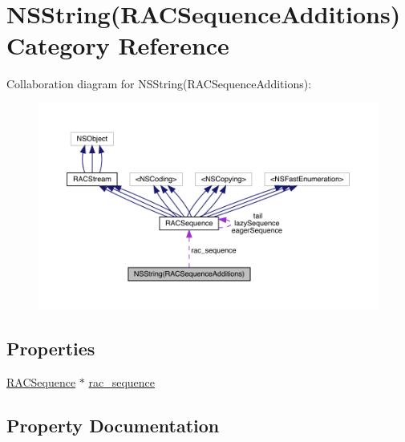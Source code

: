 \hypertarget{category_n_s_string_07_r_a_c_sequence_additions_08}{}\section{N\+S\+String(R\+A\+C\+Sequence\+Additions) Category Reference}
\label{category_n_s_string_07_r_a_c_sequence_additions_08}


Collaboration diagram for N\+S\+String(R\+A\+C\+Sequence\+Additions)\+:\nopagebreak
\begin{figure}[H]
\begin{center}
\leavevmode
\includegraphics[width=350pt]{category_n_s_string_07_r_a_c_sequence_additions_08__coll__graph}
\end{center}
\end{figure}
\subsection*{Properties}
\begin{DoxyCompactItemize}
\item 
\mbox{\hyperlink{interface_r_a_c_sequence}{R\+A\+C\+Sequence}} $\ast$ \mbox{\hyperlink{category_n_s_string_07_r_a_c_sequence_additions_08_ae57501e059118146863bb7d7093dc13b}{rac\+\_\+sequence}}
\end{DoxyCompactItemize}


\subsection{Property Documentation}
\mbox{\label{category_n_s_string_07_r_a_c_sequence_additions_08_ae57501e059118146863bb7d7093dc13b}} 
